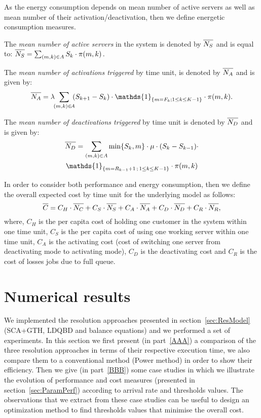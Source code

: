 \documentclass[conference]{IEEEtran}
\begin{document}
As the energy consumption depends on mean number of active servers as well as mean number of 
their activation/deactivation, then  we define energetic consumption measures.   

The \emph{mean number of active servers} in the system is denoted by $\overline{\mathstrut N_{S}}$ and is equal to:
\(
\overline{\mathstrut N_{S}}=\sum_{(m,k) \in A}S_{k} \cdot \pi(m,k) \, .
\)

The
\emph{mean number of activations triggered} by time unit,
is denoted by $\overline{\mathstrut N_{A}}$ and is given by:
\begin{equation*}
\overline{\mathstrut N_{A}}=
\lambda \! \! \sum_{(m,k) \in \! A} \! \! (S_{k+1} -  S_{k}) \cdot \mathds{1}_{\{m=F_k ; 1 \leq k \leq K-1\}} \cdot \pi(m,k) .
\end{equation*}

The
\emph{mean number of deactivations triggered} by time unit is denoted by $\overline{\mathstrut N_{D}}$ and is given by:
\begin{multline*}
\overline{\mathstrut N_{D}}=\sum_{(m,k) \in A} \min\{S_{k},m\} \cdot \mu \cdot (S_{k}-S_{k-1}) \cdot \\
\mathds{1}_{\{m=R_{k-1}+1 \, \mbox{;} \, 1 \leq k \leq K-1\}}
\cdot \pi(m,k)
\end{multline*}


In order to consider both performance and energy consumption, then we define the overall expected cost 
by time unit for the underlying model as follows:
\begin{equation*}
    \overline{\mathstrut C}=C_{H} \cdot \overline{\mathstrut N_{C}}+C_{S} \cdot \overline{\mathstrut N_{S}}+C_{A}
      \cdot \overline{\mathstrut N_{A}}+C_{D} \cdot \overline{\mathstrut N_{D}}+C_{R} \cdot \overline{\mathstrut N_{R}},
\end{equation*}
where, $C_{H}$ is the per capita cost of holding one customer in the system within one time unit,
$C_{S}$ is the per capita cost of using one working server within one time unit,
$C_{A}$ is the activating cost (cost of switching one server from deactivating mode to activating mode),
$C_{D}$ is the deactivating cost  and $C_{R}$ is the cost of losses jobs due to full queue.

\section{Numerical results}\label{sec:ResNum}
We implemented the resolution approaches presented in section~\ref{sec:ResModel} (SCA+GTH, LDQBD and balance equations) and  we performed a set of experiments. 
In this section we first present (in part~\ref{AAA}) a comparison of the three resolution approaches in terms of their respective execution time, we also compare them to a conventional method (Power method) in order to show their efficiency. Then we give (in part~\ref{BBB}) some case studies in which we illustrate the evolution of performance and cost measures (presented in section~\ref{sec:ParamPerf}) according to arrival rate 
and thresholds values. The observations that we extract from these case studies can be useful to design an optimization method to find thresholds 
values that minimise the overall cost.
\end{document}
